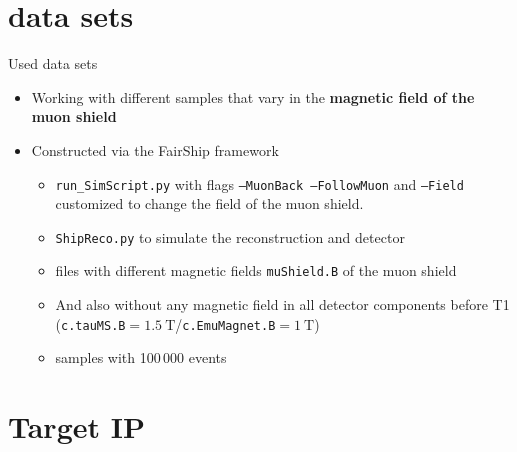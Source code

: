\section{data sets}
\begin{frame}[t]{Used data sets}
  \begin{itemize}
    \item Working with different samples that vary in the \textbf{magnetic field of the muon shield}
    \item Constructed via the FairShip framework
    \begin{itemize}
      \item \texttt{run\_SimScript.py} with flags \texttt{--MuonBack --FollowMuon} and \texttt{--Field} customized to change the field of the muon shield.
      \item \texttt{ShipReco.py} to simulate the reconstruction and detector
      \item files with different magnetic fields \texttt{muShield.B} of the muon shield
      \item And also without any magnetic field in all detector components before T1 (\texttt{c.tauMS.B}$=\SI{1.5}{\tesla}$/\texttt{c.EmuMagnet.B}$=\SI{1}{\tesla}$)
      \item samples with 100\,000 events
    \end{itemize}
  \end{itemize}
\end{frame}

\section{Target IP}



